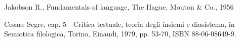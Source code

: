 Jakobson R., Fundamentals of language, The Hague, Mouton & Co., 1956

Cesare Segre, cap. 5 - Critica testuale, teoria degli insiemi e diasistema, in Semiotica filologica, Torino, Einaudi, 1979, pp. 53-70, ISBN 88-06-08649-9.